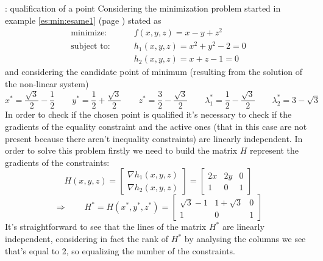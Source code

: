 	\begin{example}{: qualification of a point} \label{es:min:esame1b}
		Considering the minimization problem started in example \ref{es:min:esame1} (page \pageref{es:min:esame1}) stated as
		\begin{align*}
			\textrm{minimize:} \qquad & f(x,y,z) = x - y + z^2 \\
			\textrm{subject to:} \qquad & h_1(x,y,z) = x^2 + y^2 - 2 = 0 \\
			& h_2(x,y,z) = x+z-1 = 0
		\end{align*}
		and considering the candidate point of minimum (resulting from the solution of the non-linear system)
		\[ x^* = \frac{\sqrt 3}{2} - \frac 1 2 \qquad y^* = \frac 1 2 + \frac{\sqrt 3} 2 \qquad z^* = \frac 3 2 - \frac{\sqrt 3}{2} \qquad \lambda_1^* = \frac 1 2 - \frac{\sqrt3}{2} \qquad \lambda_2^* = 3-\sqrt 3 \]
		In order to check if the chosen point is qualified it's necessary to check if the gradients of the equality constraint and the active ones (that in this case are not present because there aren't inequality constraints) are linearly independent. In order to solve this problem firstly we need to build the matrix $H$ represent the gradients of the constraints:
		\[ H(x,y,z) = \begin{bmatrix}
			\nabla h_1(x,y,z) \\ \nabla h_2(x,y,z)
		\end{bmatrix} = \begin{bmatrix}
			2x & 2y & 0 \\ 1 & 0 & 1
		\end{bmatrix} \] \[ \Rightarrow \qquad  H^*=  H(x^*,y^*,z^*) = \begin{bmatrix}
			\sqrt 3 - 1 & 1 + \sqrt 3 & 0 \\ 1 & 0 & 1
		\end{bmatrix} \]
		It's straightforward to see that the lines of the matrix $H^*$ are linearly independent, considering in fact the rank of $H^*$ by analysing the columns we see that's equal to 2, so equalizing the number of the constraints.
		
	\end{example}
	
	
